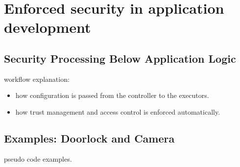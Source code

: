 \section{Enforced security in application development}

\subsection{Security Processing Below Application Logic}

workflow explanation:
\begin{itemize}
	\item how configuration is passed from the controller to the executors.
	\item how trust management and access control is enforced automatically.
\end{itemize}

\subsection{Examples: Doorlock and Camera}

pseudo code examples.



